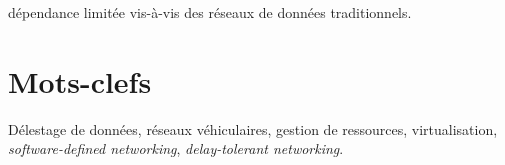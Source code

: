 dépendance limitée vis-à-vis des réseaux de données traditionnels.

\section*{Mots-clefs}

Délestage de données, réseaux véhiculaires, gestion de ressources, virtualisation, \textit{software-defined networking}, \textit{delay-tolerant networking}.
